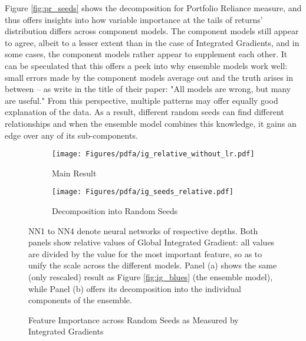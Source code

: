 		Figure \ref{fig:pr_seeds} shows the decomposition for Portfolio Reliance measure, and thus offers insights into how variable importance at the tails of returns' distribution differs across component models. The component models still appear to agree, albeit to a lesser extent than in the case of Integrated Gradients, and in some cases, the component models rather appear to supplement each other. It can be speculated that this offers a peek into why ensemble models work well: small errors made by the component models average out and the truth arises in between -- as \cite{fisher2019all} write in the title of their paper: "All models are wrong, but many are useful." From this perspective, multiple patterns may offer equally good explanation of the data. As a result, different random seeds can find different relationships and when the ensemble model combines this knowledge, it gains an edge over any of its sub-components.  
	
		\begin{figure}	
			\centering		
			\begin{subfigure}[t]{\textwidth}
				\texttt{[image: Figures/pdfa/ig\_relative\_without\_lr.pdf]}
				\caption{Main Result}
				\label{fig:ig_seeds_main}
			\end{subfigure}
			
			\begin{subfigure}[t]{\textwidth}
				\centering
				\texttt{[image: Figures/pdfa/ig\_seeds\_relative.pdf]}
				\caption{Decomposition into Random Seeds}
				\label{fig:ig_seeds_relative}
			\end{subfigure}
			\caption{Feature Importance across Random Seeds as Measured by Integrated Gradients}
			\label{fig:ig_seeds}
			\medskip
			\small
			NN1 to NN4 denote neural networks of respective depths. Both panels show relative values of Global Integrated Gradient: all values are divided by the value for the most important feature, so as to unify the scale across the different models. Panel (a) shows the same (only rescaled) result as Figure \ref{fig:ig_blues} (the ensemble model), while Panel (b) offers its decomposition into the individual components of the ensemble. 
		\end{figure}
		
